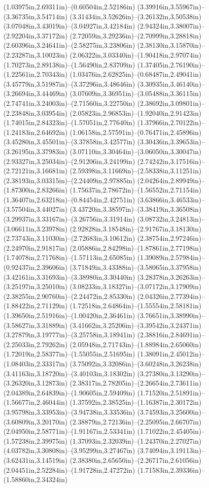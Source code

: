 (1.03975in,2.69311in)--(0.60504in,2.52186in) (3.39916in,3.55967in)--(3.36735in,3.54714in) (3.31434in,3.52626in)--(3.26132in,3.50538in) (3.07048in,3.43019in)--(3.04927in,3.42184in) (2.94324in,3.38007in)--(2.92204in,3.37172in) (2.72059in,3.29236in)--(2.70999in,3.28818in) (2.60396in,3.24641in)--(2.58275in,3.23806in) (2.38130in,3.15870in)--(2.23287in,3.10023in) (2.06322in,3.03340in)--(1.90418in,2.97074in) (1.70273in,2.89138in)--(1.56490in,2.83709in) (1.37405in,2.76190in)--(1.22561in,2.70343in) (1.03476in,2.62825in)--(0.68487in,2.49041in) (3.45779in,3.51987in)--(3.37296in,3.48646in) (3.30935in,3.46140in)--(3.26694in,3.44469in) (3.07609in,3.36951in)--(3.05488in,3.36115in) (2.74741in,3.24003in)--(2.71560in,3.22750in) (2.38692in,3.09801in)--(2.23848in,3.03954in) (2.05823in,2.96853in)--(1.92040in,2.91423in) (1.74015in,2.84323in)--(1.57051in,2.77640in) (1.37966in,2.70122in)--(1.24183in,2.64692in) (1.06158in,2.57591in)--(0.76471in,2.45896in) (3.45280in,3.45501in)--(3.37858in,3.42577in) (3.30436in,3.39653in)--(3.26195in,3.37983in) (3.07110in,3.30464in)--(3.06050in,3.30047in) (2.93327in,3.25034in)--(2.91206in,3.24199in) (2.74242in,3.17516in)--(2.72121in,3.16681in) (2.59398in,3.11669in)--(2.58338in,3.11251in) (2.38193in,3.03315in)--(2.24409in,2.97885in) (2.04264in,2.89949in)--(1.87300in,2.83266in) (1.75637in,2.78672in)--(1.56552in,2.71154in) (1.36407in,2.63218in)--(0.84454in,2.42751in) (3.63866in,3.46533in)--(3.57504in,3.44027in) (3.43720in,3.38597in)--(3.38419in,3.36508in) (3.29937in,3.33167in)--(3.26756in,3.31914in) (3.08732in,3.24813in)--(3.06611in,3.23978in) (2.92828in,3.18548in)--(2.91767in,3.18130in) (2.73743in,3.11030in)--(2.72683in,3.10612in) (2.38754in,2.97246in)--(2.24970in,2.91817in) (2.05886in,2.84298in)--(1.87861in,2.77198in) (1.74078in,2.71768in)--(1.57113in,2.65085in) (1.39089in,2.57984in)--(0.92437in,2.39606in) (3.71849in,3.43388in)--(3.58065in,3.37958in) (3.42161in,3.31693in)--(3.38980in,3.30440in) (3.28378in,3.26263in)--(3.25197in,3.25010in) (3.08233in,3.18327in)--(3.07172in,3.17909in) (2.38255in,2.90760in)--(2.24472in,2.85330in) (2.04326in,2.77394in)--(1.88422in,2.71129in) (1.72518in,2.64864in)--(1.55554in,2.58181in) (1.39650in,2.51916in)--(1.00420in,2.36461in) (3.76651in,3.38990in)--(3.58627in,3.31889in) (3.41662in,3.25206in)--(3.39542in,3.24371in) (3.27879in,3.19777in)--(3.25758in,3.18941in) (2.38816in,2.84691in)--(2.25033in,2.79262in) (2.05948in,2.71743in)--(1.88984in,2.65060in) (1.72019in,2.58377in)--(1.55055in,2.51695in) (1.38091in,2.45012in)--(1.08403in,2.33317in) (3.75092in,3.32086in)--(3.60248in,3.26238in) (3.41163in,3.18720in)--(3.40103in,3.18302in) (3.27380in,3.13290in)--(3.26320in,3.12873in) (2.38317in,2.78205in)--(2.26654in,2.73611in) (2.04389in,2.64839in)--(1.90605in,2.59409in) (1.71520in,2.51891in)--(1.56677in,2.46044in) (1.37592in,2.38525in)--(1.16387in,2.30172in) (3.95798in,3.33953in)--(3.94738in,3.33536in) (3.74593in,3.25600in)--(3.60809in,3.20170in) (2.38879in,2.72136in)--(2.25095in,2.66707in) (2.04950in,2.58771in)--(1.91167in,2.53341in) (1.71022in,2.45405in)--(1.57238in,2.39975in) (1.37093in,2.32039in)--(1.24370in,2.27027in) (4.03782in,3.30808in)--(3.95299in,3.27467in) (3.74094in,3.19113in)--(3.62431in,3.14519in) (2.38380in,2.65650in)--(2.26717in,2.61056in) (2.04451in,2.52284in)--(1.91728in,2.47272in) (1.71583in,2.39336in)--(1.58860in,2.34324in) 
